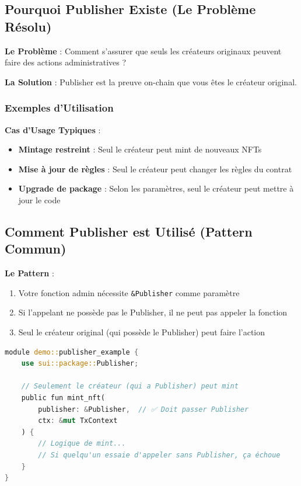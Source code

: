 \documentclass[11pt]{article}
\begin{document}
\subsection{Pourquoi Publisher Existe (Le Problème Résolu)}

\begin{explainBox}
\textbf{Le Problème} : Comment s'assurer que seuls les créateurs originaux peuvent faire des actions administratives ?

\textbf{La Solution} : Publisher est la preuve on-chain que vous êtes le créateur original.
\end{explainBox}

\subsubsection{Exemples d'Utilisation}

\begin{exampleBox}
\textbf{Cas d'Usage Typiques} :
\begin{itemize}
  \item \textbf{Mintage restreint} : Seul le créateur peut mint de nouveaux NFTs
  \item \textbf{Mise à jour de règles} : Seul le créateur peut changer les règles du contrat
  \item \textbf{Upgrade de package} : Selon les paramètres, seul le créateur peut mettre à jour le code
\end{itemize}
\end{exampleBox}

\subsection{Comment Publisher est Utilisé (Pattern Commun)}

\begin{explainBox}
\textbf{Le Pattern} :
\begin{enumerate}
  \item Votre fonction admin nécessite \texttt{\&Publisher} comme paramètre
  \item Si l'appelant ne possède pas le Publisher, il ne peut pas appeler la fonction
  \item Seul le créateur original (qui possède le Publisher) peut faire l'action
\end{enumerate}
\end{explainBox}

\begin{lstlisting}[language=Rust, caption=Exemple d'Utilisation de Publisher]
module demo::publisher_example {
    use sui::package::Publisher;
    
    // Seulement le créateur (qui a Publisher) peut mint
    public fun mint_nft(
        publisher: &Publisher,  // ✅ Doit passer Publisher
        ctx: &mut TxContext
    ) {
        // Logique de mint...
        // Si quelqu'un essaie d'appeler sans Publisher, ça échoue
    }
}
\end{lstlisting}
\end{document}
